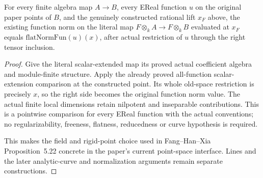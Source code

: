 \begin{theorem}
\label{spectrum:paper-flat-norm-rigid-lift}
\leanok
{}
For every finite algebra map $A\to B$, every EReal function $u$ on the
original paper points of $B$, and the genuinely constructed rational
lift $x_F$ above, the existing function norm on the literal map
$F\otimes_k A\to F\otimes_k B$ evaluated at $x_F$ equals
$\mathrm{flatNormFun}(u)(x)$, after actual restriction of $u$ through the
right tensor inclusion.
\end{theorem}
\begin{proof}
Give the literal scalar-extended map its proved actual coefficient algebra
and module-finite structure. Apply the already proved all-function
scalar-extension comparison at the constructed point. Its whole old-space
restriction is precisely $x$, so the right side becomes the original
function norm value. The actual finite local dimensions retain nilpotent
and inseparable contributions. This is a pointwise comparison for every
EReal function with the actual conventions; no regularizability, freeness,
flatness, reducedness or curve hypothesis is required.

This makes the field and rigid-point choice used in Fang--Han--Xia
Proposition~5.22 concrete in the paper's current point-space interface.
Lines and the later analytic-curve and normalization arguments remain
separate constructions.
\end{proof}
